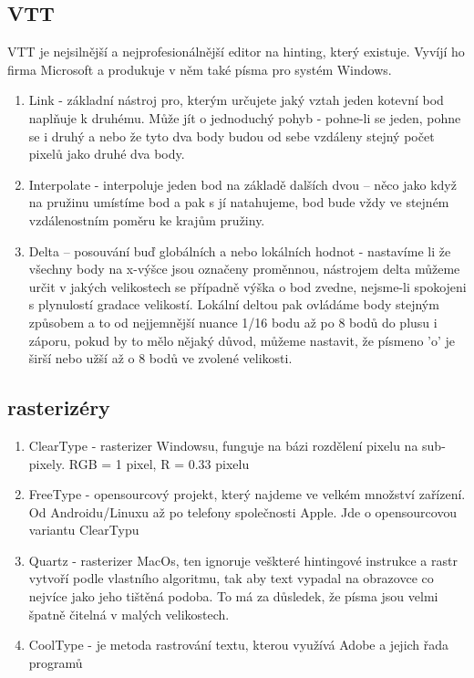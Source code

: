 \documentclass[a4paper]{article}
\begin{document}
\subsection{VTT}
VTT je nejsilnější a nejprofesionálnější editor na hinting, který existuje. Vyvíjí ho firma Microsoft a produkuje v něm také písma pro systém Windows.
\begin{enumerate}
\item Link - základní nástroj pro, kterým určujete jaký vztah jeden kotevní bod naplňuje k druhému. Může jít o jednoduchý pohyb - pohne-li se jeden, pohne se i druhý a nebo že tyto dva body budou od sebe vzdáleny stejný počet pixelů jako druhé dva body.

\item Interpolate - interpoluje jeden bod na základě dalších dvou – něco jako když na pružinu umístíme bod a pak s jí natahujeme, bod bude vždy ve stejném vzdálenostním poměru ke krajům pružiny.

\item Delta – posouvání buď globálních a nebo lokálních hodnot - nastavíme li že všechny body na x-výšce jsou označeny proměnnou, nástrojem delta můžeme určit v jakých velikostech se případně výška o bod zvedne, nejsme-li spokojeni s plynulostí gradace velikostí. Lokální deltou pak ovládáme body stejným způsobem a to od nejjemnější nuance 1/16 bodu až po 8 bodů do plusu i záporu, pokud by to mělo nějaký důvod, můžeme nastavit, že písmeno 'o' je širší nebo užší až o 8 bodů ve zvolené velikosti. 

\end{enumerate}

\subsection{rasterizéry}

\begin{enumerate}
\item ClearType - rasterizer Windowsu, funguje na bázi rozdělení pixelu na sub-pixely. RGB = 1 pixel, R = 0.33 pixelu

\item FreeType - opensourcový projekt, který najdeme ve velkém množství zařízení. Od Androidu/Linuxu až po telefony společnosti Apple. Jde o opensourcovou variantu ClearTypu

\item Quartz - rasterizer MacOs, ten ignoruje veškteré hintingové instrukce a rastr vytvoří podle vlastního algoritmu, tak aby text vypadal na obrazovce co nejvíce jako jeho tištěná podoba. To má za důsledek, že písma jsou velmi špatně čitelná v malých velikostech.

\item CoolType - je metoda rastrování textu, kterou využívá Adobe a jejich řada programů
\end{enumerate}
\end{document}
